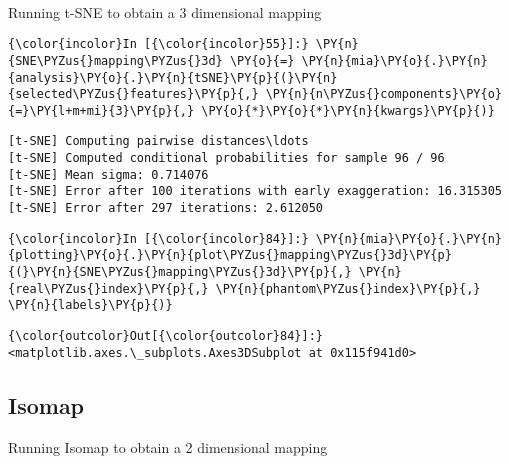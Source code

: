     \begin{center}
    \end{center}
    { \hspace*{\fill} \\}

    Running t-SNE to obtain a 3 dimensional mapping

    \begin{Verbatim}[commandchars=\\\{\}]
{\color{incolor}In [{\color{incolor}55}]:} \PY{n}{SNE\PYZus{}mapping\PYZus{}3d} \PY{o}{=} \PY{n}{mia}\PY{o}{.}\PY{n}{analysis}\PY{o}{.}\PY{n}{tSNE}\PY{p}{(}\PY{n}{selected\PYZus{}features}\PY{p}{,} \PY{n}{n\PYZus{}components}\PY{o}{=}\PY{l+m+mi}{3}\PY{p}{,} \PY{o}{*}\PY{o}{*}\PY{n}{kwargs}\PY{p}{)}
\end{Verbatim}

    \begin{Verbatim}[commandchars=\\\{\}]
[t-SNE] Computing pairwise distances\ldots
[t-SNE] Computed conditional probabilities for sample 96 / 96
[t-SNE] Mean sigma: 0.714076
[t-SNE] Error after 100 iterations with early exaggeration: 16.315305
[t-SNE] Error after 297 iterations: 2.612050
    \end{Verbatim}

    \begin{Verbatim}[commandchars=\\\{\}]
{\color{incolor}In [{\color{incolor}84}]:} \PY{n}{mia}\PY{o}{.}\PY{n}{plotting}\PY{o}{.}\PY{n}{plot\PYZus{}mapping\PYZus{}3d}\PY{p}{(}\PY{n}{SNE\PYZus{}mapping\PYZus{}3d}\PY{p}{,} \PY{n}{real\PYZus{}index}\PY{p}{,} \PY{n}{phantom\PYZus{}index}\PY{p}{,} \PY{n}{labels}\PY{p}{)}
\end{Verbatim}

            \begin{Verbatim}[commandchars=\\\{\}]
{\color{outcolor}Out[{\color{outcolor}84}]:} <matplotlib.axes.\_subplots.Axes3DSubplot at 0x115f941d0>
\end{Verbatim}

    \subsection{Isomap}\label{isomap}

Running Isomap to obtain a 2 dimensional mapping

